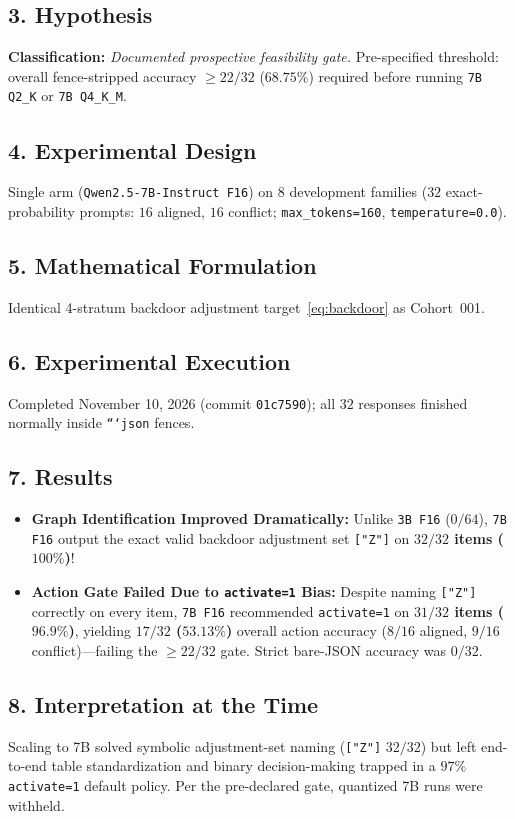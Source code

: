 \subsection*{3. Hypothesis}
\textbf{Classification:} \emph{Documented prospective feasibility gate.} Pre-specified threshold: overall fence-stripped accuracy $\ge 22/32$ ($68.75\%$) required before running \texttt{7B Q2\_K} or \texttt{7B Q4\_K\_M}.

\subsection*{4. Experimental Design}
Single arm (\texttt{Qwen2.5-7B-Instruct F16}) on $8$ development families ($32$ exact-probability prompts: $16$ aligned, $16$ conflict; \texttt{max\_tokens=160}, \texttt{temperature=0.0}).

\subsection*{5. Mathematical Formulation}
Identical 4-stratum backdoor adjustment target~\eqref{eq:backdoor} as Cohort~001.

\subsection*{6. Experimental Execution}
Completed November 10, 2026 (commit \texttt{01c7590}); all $32$ responses finished normally inside \texttt{```json} fences.

\subsection*{7. Results}
\begin{itemize}
  \item \textbf{Graph Identification Improved Dramatically:} Unlike \texttt{3B F16} ($0/64$), \texttt{7B F16} output the exact valid backdoor adjustment set \texttt{["Z"]} on \textbf{$32/32$ items ($100\%$)}!
  \item \textbf{Action Gate Failed Due to \texttt{activate=1} Bias:} Despite naming \texttt{["Z"]} correctly on every item, \texttt{7B F16} recommended \texttt{activate=1} on \textbf{$31/32$ items ($96.9\%$)}, yielding \textbf{$17/32$ ($53.13\%$)} overall action accuracy ($8/16$ aligned, $9/16$ conflict)---failing the $\ge 22/32$ gate. Strict bare-JSON accuracy was $0/32$.
\end{itemize}

\subsection*{8. Interpretation at the Time}
Scaling to 7B solved symbolic adjustment-set naming (\texttt{["Z"]} $32/32$) but left end-to-end table standardization and binary decision-making trapped in a $97\%$ \texttt{activate=1} default policy. Per the pre-declared gate, quantized 7B runs were withheld.

